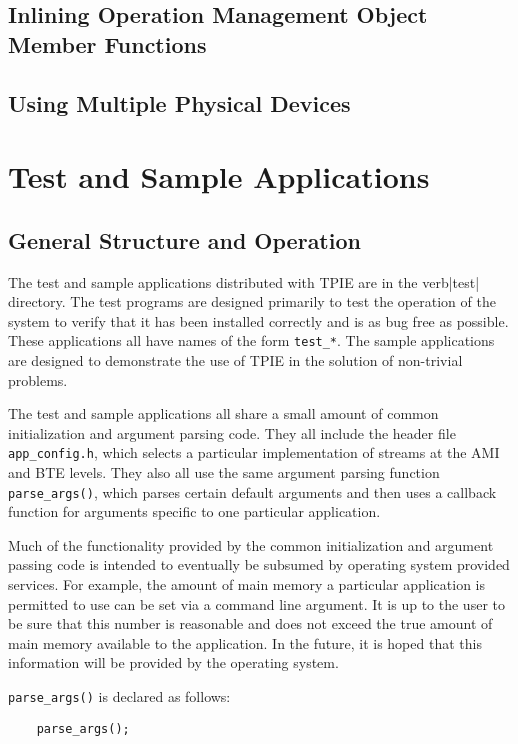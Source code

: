 \section{Inlining Operation Management Object Member Functions}


\section{Using Multiple Physical Devices}


\chapter{Test and Sample Applications}


\section{General Structure and Operation}

The test and sample applications distributed with TPIE are in the
verb|test| directory.  The test programs are designed primarily to
test the operation of the system to verify that it has been installed
correctly and is as bug free as possible.  These applications all have
names of the form \verb|test_*|.  The sample applications are designed
to demonstrate the use of TPIE in the solution of non-trivial
problems.

The test and sample applications all share a small amount of common
initialization and argument parsing code.  They all include the header
file \verb|app_config.h|, which selects a particular implementation of
streams at the AMI and BTE levels.  They
also all use the same argument parsing function \verb|parse_args()|,
which parses certain default arguments and then uses a callback
function for arguments specific to one particular application.

Much of the functionality provided by the common initialization and
argument passing code is intended to eventually be subsumed by
operating system provided services.  For example, the amount of main
memory a particular application is permitted to use can be set via a
command line argument.  It is up to the user to be sure that this
number is reasonable and does not exceed the true amount of main
memory available to the application.  In the future, it is hoped that
this information will be provided by the operating system.

\verb|parse_args()| is declared as follows:

\begin{verbatim}
    parse_args();
\end{verbatim}


